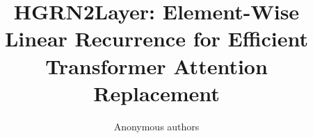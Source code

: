 \title{\textbf{HGRN2Layer: Element-Wise Linear Recurrence for Efficient Transformer Attention Replacement}}

\author{Anonymous authors}
